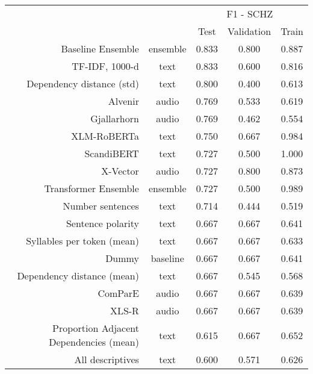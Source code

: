 \begin{tabular}{rc||ccc}
\toprule
\multicolumn{1}{c}{}  & \multicolumn{1}{c}{} & \multicolumn{3}{c}{F1 - SCHZ} \\
                                        &&      Test & Validation & Train \\
\midrule
\hline
                      Baseline Ensemble & ensemble &     0.833 &      0.800 & 0.887 \\
                         TF-IDF, 1000-d &     text &     0.833 &      0.600 & 0.816 \\
              Dependency distance (std) &     text &     0.800 &      0.400 & 0.613 \\
                                Alvenir &    audio &     0.769 &      0.533 & 0.619 \\
                            Gjallarhorn &    audio &     0.769 &      0.462 & 0.554 \\
                            XLM-RoBERTa &     text &     0.750 &      0.667 & 0.984 \\
                             ScandiBERT &     text &     0.727 &      0.500 & 1.000 \\
                               X-Vector &    audio &     0.727 &      0.800 & 0.873 \\
                   Transformer Ensemble & ensemble &     0.727 &      0.500 & 0.989 \\
                       Number sentences &     text &     0.714 &      0.444 & 0.519 \\
                      Sentence polarity &     text &     0.667 &      0.667 & 0.641 \\
             Syllables per token (mean) &     text &     0.667 &      0.667 & 0.633 \\
                                  Dummy & baseline &     0.667 &      0.667 & 0.641 \\
             Dependency distance (mean) &     text &     0.667 &      0.545 & 0.568 \\
                                ComParE &    audio &     0.667 &      0.667 & 0.639 \\
                                  XLS-R &    audio &     0.667 &      0.667 & 0.639 \\
Proportion Adjacent Dependencies (mean) &     text &     0.615 &      0.667 & 0.652 \\
                       All descriptives &     text &     0.600 &      0.571 & 0.626 \\

\end{tabular}
